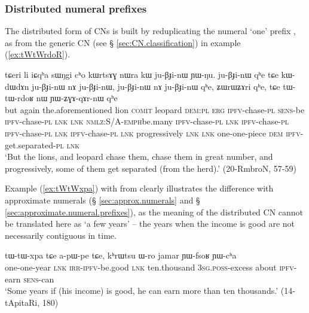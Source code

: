 \subsubsection{Distributed numeral prefixes} \label{sec:numeral.prefixes.distributed}
The distributed form of CNs is built by reduplicating the numeral `one' prefix , as  from the generic CN  (see § \ref{sec:CN.classification}) in example (\ref{ex:tWtWrdoR}).

 \begin{exe}
\ex  \label{ex:tWtWrdoR}
 \gll 
tɕeri li iɕqʰa sɯŋgi cʰo kɯrtsɤɣ nɯra kɯ ju-βɟi-nɯ ɲɯ-ŋu. ju-βɟi-nɯ qʰe tɕe kɯ-dɯ\redp{}dɤn ju-βɟi-nɯ nɤ ju-βɟi-nɯ, ju-βɟi-nɯ nɤ ju-βɟi-nɯ qʰe, ʑɯrɯʑɤri qʰe, tɕe tɯ-tɯ-rdoʁ nɯ ɲɯ-ʑɣɤ-qɤr-nɯ qʰe \\
but again the.aforementioned  lion \textsc{comit} leopard \textsc{dem}:\textsc{pl} \textsc{erg} \textsc{ipfv}-chase-\textsc{pl} \textsc{sens}-be \textsc{ipfv}-chase-\textsc{pl} \textsc{lnk} \textsc{lnk} \textsc{nmlz}:S/A-\textsc{emph}\redp{}be.many \textsc{ipfv}-chase-\textsc{pl} \textsc{lnk} \textsc{ipfv}-chase-\textsc{pl}  \textsc{ipfv}-chase-\textsc{pl} \textsc{lnk} \textsc{ipfv}-chase-\textsc{pl} \textsc{lnk} progressively \textsc{lnk} \textsc{lnk} one-one-piece \textsc{dem} \textsc{ipfv}-get.separated-\textsc{pl} \textsc{lnk} \\
\glt `But the lions, and leopard chase them, chase them in great number, and progressively, some of them get separated (from the herd).' (20-RmbroN, 57-59)
   \end{exe}

 Example (\ref{ex:tWtWxpa}) with  from  clearly illustrates the difference with approximate numerals (§ \ref{sec:approx.numerals} and § \ref{sec:approximate.numeral.prefixes}), as the meaning of the distributed CN cannot be translated here as `a few years' -- the years when the income is good are not necessarily contiguous in time.

\begin{exe}
\ex  \label{ex:tWtWxpa}
 \gll   tɯ-tɯ-xpa tɕe a-pɯ-pe tɕe, kʰrɯtsu ɯ-ro jamar ɲɯ-fsoʁ ɲɯ-cʰa \\
one-one-year  \textsc{lnk} \textsc{irr}-\textsc{ipfv}-be.good \textsc{lnk} ten.thousand \textsc{3sg}.\textsc{poss}-excess about \textsc{ipfv}-earn \textsc{sens}-can \\ 
 \glt `Some years if (his income) is good, he can earn more than ten thousands.' (14-tApitaRi, 180)
 \end{exe}

